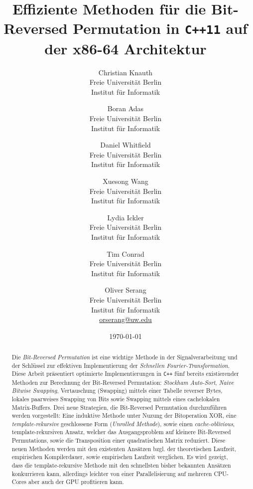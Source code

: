 \documentclass[10pt]{article}
\begin{document}
\title{Effiziente Methoden für die Bit-Reversed Permutation in 
	{\tt C++11} auf der x86-64 Architektur }

\author{Christian Knauth\\
Freie Universit\"at Berlin\\
Institut f\"{u}r Informatik
\and
Boran Adas\\
Freie Universit\"at Berlin\\
Institut f\"{u}r Informatik
\and
Daniel Whitfield\\
Freie Universit\"at Berlin\\
Institut f\"{u}r Informatik
\and
Xuesong Wang\\
Freie Universit\"at Berlin\\
Institut f\"{u}r Informatik
\and
Lydia Ickler\\
Freie Universit\"at Berlin\\
Institut f\"{u}r Informatik
\and
Tim Conrad\\
Freie Universit\"at Berlin\\
Institut f\"{u}r Informatik
\and
Oliver Serang\\
Freie Universit\"at Berlin\\
Institut f\"{u}r Informatik\\
\url{orserang@uw.edu}
}

\date{{\small \today}}

\maketitle

\begin{abstract}
\noindent Die {\it Bit-Reversed Permutation} ist eine wichtige Methode 
in der Signalverarbeitung und der Schlüssel zur effektiven Implementierung der 
{\it Schnellen Fourier-Transformation}. Diese Arbeit präsentiert 
optimierte Implementierungen in {\tt C++} fünf bereits existierender Methoden 
zur Berechnung der Bit-Reversed Permutation:
{\it Stockham Auto-Sort}, {\it Naive Bitwise Swapping}, Vertauschung (Swapping) mittels 
einer Tabelle reverser Bytes, lokales paarweises Swapping von Bits sowie Swapping 
mittels eines cachelokalen Matrix-Buffers. Drei neue Strategien, die Bit-Reversed 
Permutation durchzuführen werden vorgestellt: 
Eine induktive Methode unter Nuzung der Bitoperation XOR, eine {\it template-rekursive}
geschlossene Form ({\it Unrolled Methode}), sowie einen {\it cache-oblivious}, template-rekursiven Ansatz, 
welcher das Ausgangsproblem auf kleinere Bit-Reversed Permutations, 
sowie die Transposition einer quadratischen Matrix reduziert. 
Diese neuen Methoden werden mit den existenten Ansätzen bzgl. der theoretischen Laufzeit, 
empirischen Kompilerdauer, sowie empirischen Laufzeit verglichen. Es wird gezeigt, dass 
die template-rekursive Methode mit den schnellsten bisher bekannten Ansätzen 
konkurrieren kann, allerdings leichter von einer Parallelisierung auf mehreren CPU-Cores
aber auch der GPU profitieren kann.
\end{abstract}
\end{document}
